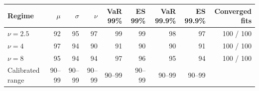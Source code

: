 \begin{tabular}{@{}lrrrrrrrr@{}}
\toprule
Regime & $\mu$ & $\sigma$ & $\nu$ & VaR 99\% & ES 99\% & VaR 99.9\% & ES 99.9\% & Converged fits \\
\midrule
$\nu = 2.5$ & 92 & 95 & 97 & 99 & 99 & 98 & 97 & 100 / 100 \\
$\nu = 4$ & 97 & 94 & 90 & 91 & 90 & 90 & 91 & 100 / 100 \\
$\nu = 8$ & 95 & 94 & 94 & 97 & 96 & 95 & 94 & 100 / 100 \\
Calibrated range & 90--99 & 90--99 & 90--99 & 90--99 & 90--99 & 90--99 & 90--99 &  \\
\bottomrule
\end{tabular}
